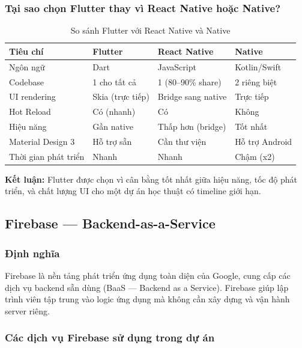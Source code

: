 \subsubsection{Tại sao chọn Flutter thay vì React Native hoặc Native?}

\begin{table}[H]
\centering
\caption{So sánh Flutter với React Native và Native}
\label{tab:flutter-comparison}
\begin{tabularx}{\textwidth}{|l|X|X|X|}
\hline
\textbf{Tiêu chí} & \textbf{Flutter} & \textbf{React Native} & \textbf{Native} \\
\hline
Ngôn ngữ & Dart & JavaScript & Kotlin/Swift \\
\hline
Codebase & 1 cho tất cả & 1 (80--90\% share) & 2 riêng biệt \\
\hline
UI rendering & Skia (trực tiếp) & Bridge sang native & Trực tiếp \\
\hline
Hot Reload & Có (nhanh) & Có & Không \\
\hline
Hiệu năng & Gần native & Thấp hơn (bridge) & Tốt nhất \\
\hline
Material Design 3 & Hỗ trợ sẵn & Cần thư viện & Hỗ trợ Android \\
\hline
Thời gian phát triển & Nhanh & Nhanh & Chậm (x2) \\
\hline
\end{tabularx}
\end{table}

\textbf{Kết luận:} Flutter được chọn vì cân bằng tốt nhất giữa hiệu năng, tốc độ phát triển, và chất lượng UI cho một dự án học thuật có timeline giới hạn.

\subsection{Firebase --- Backend-as-a-Service}

\subsubsection{Định nghĩa}

Firebase là nền tảng phát triển ứng dụng toàn diện của Google, cung cấp các dịch vụ backend sẵn dùng (BaaS --- Backend as a Service). Firebase giúp lập trình viên tập trung vào logic ứng dụng mà không cần xây dựng và vận hành server riêng.

\subsubsection{Các dịch vụ Firebase sử dụng trong dự án}

